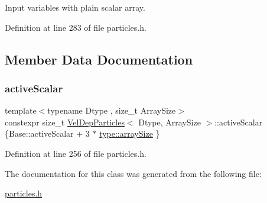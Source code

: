 Input variables with plain scalar array. 



Definition at line 283 of file particles.\+h.



\subsection{Member Data Documentation}
\mbox{\label{class_vel_dep_particles_a5a6db2817ec1f38c80ec80586e00f03e}} 
\subsubsection{\texorpdfstring{active\+Scalar}{activeScalar}}
{\footnotesize\ttfamily template$<$typename Dtype , size\+\_\+t Array\+Size$>$ \\
constexpr size\+\_\+t \mbox{\hyperlink{class_vel_dep_particles}{Vel\+Dep\+Particles}}$<$ Dtype, Array\+Size $>$\+::active\+Scalar \{Base\+::active\+Scalar + 3 $\ast$ \mbox{\hyperlink{struct_space_h_1_1_proto_type_a52e6df98534a97aa207f4447abd14d3c}{type\+::array\+Size}} \}\hspace{0.3cm}{\ttfamily [static]}}



Definition at line 256 of file particles.\+h.



The documentation for this class was generated from the following file\+:\begin{DoxyCompactItemize}
\item 
\mbox{\hyperlink{particles_8h}{particles.\+h}}\end{DoxyCompactItemize}
